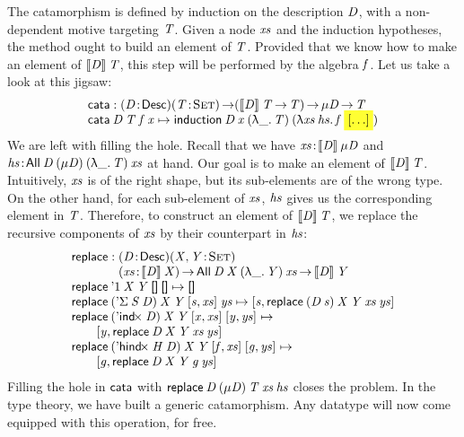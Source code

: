 The catamorphism is defined by induction on the description $\V{D}$,
with a non-dependent motive targeting $\V{T}$. Given a node $\V{xs}$
and the induction hypotheses, the method ought to build an element of
$\V{T}$. Provided that we know how to make an element of
$\descop{\V{D}}{\V{T}}$, this step will be performed by the algebra
$\V{f}$. Let us take a look at this jigsaw:
%
\[\stk{
\cata : \PITEL{\V{D}}{\Desc}
           \PI{\V{T}}{\Set}
           (\descop{\V{D}}{\V{T}} \To \V{T}) \To 
           \Mu{\V{D}} \To \V{T} \\
\cata\: \V{D}\: \V{T}\: \V{f\: \V{x}} \mapsto
  \F{induction}\: \V{D}\:\V{x}\: (\LAM{\_}\V{T})\: (\LAM{\V{xs}\:\V{hs}} \V{f}\: \SHED)
}\]
%
We are left with filling the hole. Recall that we have
\(\Bhab{\V{xs}}{\descop{\V{D}}{\Mu{\V{D}}}}\) and
\(\Bhab{\V{hs}}{\All{\V{D}}{(\Mu{\V{D}})}{(\LAM{\_} \V{T})}{\V{xs}}}\)
at hand. Our goal is to make an element of
\(\descop{\V{D}}{\V{T}}\). Intuitively, $\V{xs}$ is of the right
shape, but its sub-elements are of the wrong type. On the other hand,
for each sub-element of $\V{xs}$, $\V{hs}$ gives us the corresponding
element in $\V{T}$.  Therefore, to construct an element of
\(\descop{\V{D}}{\V{T}}\), we replace the recursive components of
\(\V{xs}\) by their counterpart in \(\V{hs}\):
%
\[\stk{
\F{replace} : \stk{\PITEL{\V{D}}{\Desc}
                   \PITEL{\V{X},\V{Y}}{\Set}\\
                   \PI{\V{xs}}{\descop{\V{D}}{\V{X}}} 
                   \All{\V{D}}{\V{X}}{(\LAM{\_}\V{Y})}{\V{xs}} \To
                   \descop{\V{D}}{\V{Y}}} \\
\F{replace}\: \DUnit\:          \V{X}\: \V{Y}\: \Void\:          \Void          \mapsto 
    \Void                                                                                                         \\
\F{replace}\: (\DSigma{\V{S}}{\V{D}})\: \V{X}\: \V{Y}\: \pair{\V{s}}{\V{xs}}{}\: \V{ys}             \mapsto
    \pair{\V{s}}{\F{replace}\: (\V{D}\: \V{s})\: \V{X}\: \V{Y}\: \V{xs}\: \V{ys}}{}                                 \\
\F{replace}\: (\DIndx{\V{D}})\:     \V{X}\: \V{Y}\: \pair{\V{x}}{\V{xs}}{}\: \pair{\V{y}}{\V{ys}}{} \mapsto       \\
\qquad  \pair{\V{y}}{\F{replace}\: \V{D}\: \V{X}\: \V{Y}\: \V{xs}\: \V{ys}}{}                                     \\
\F{replace}\: (\DHindx{\V{H}}{\V{D}})\: \V{X}\: \V{Y}\: \pair{\V{f}}{\V{xs}}{}\: \pair{\V{g}}{\V{ys}}{} \mapsto   \\
\qquad  \pair{\V{g}}{\F{replace}\: \V{D}\: \V{X}\: \V{Y}\: \V{g}\: \V{ys}}{}
}\]
%
Filling the hole in $\F{cata}$ with \(\F{replace}\: \V{D}\:
(\Mu{\V{D}})\: \V{T}\: \V{xs}\: \V{hs}\) closes the problem. In the
type theory, we have built a generic catamorphism. Any datatype will
now come equipped with this operation, for free.

